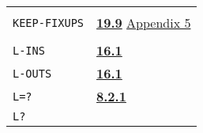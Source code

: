 \documentclass[a4paper]{scrbook}
\begin{document}
\begin{longtable}[]{@{}ll@{}}
\begin{minipage}[t]{0.24\columnwidth}\raggedright\strut
\strut
\end{minipage} & \begin{minipage}[t]{0.70\columnwidth}\raggedright\strut
\strut
\end{minipage}\tabularnewline
\begin{minipage}[t]{0.24\columnwidth}\raggedright\strut
\texttt{KEEP-FIXUPS}\strut
\end{minipage} & \begin{minipage}[t]{0.70\columnwidth}\raggedright\strut
\textbf{\href{19-compiled-programs.md\#199-fixups}{19.9}}
\href{appendix-5-initial-settings.md\#appendix-5-initial-settings}{Appendix 5}\strut
\end{minipage}\tabularnewline
\begin{minipage}[t]{0.24\columnwidth}\raggedright\strut
\strut
\end{minipage} & \begin{minipage}[t]{0.70\columnwidth}\raggedright\strut
\strut
\end{minipage}\tabularnewline
\begin{minipage}[t]{0.24\columnwidth}\raggedright\strut
\texttt{L-INS}\strut
\end{minipage} & \begin{minipage}[t]{0.70\columnwidth}\raggedright\strut
\textbf{\href{16-errors-frames-etc.md\#161-listen}{16.1}}\strut
\end{minipage}\tabularnewline
\begin{minipage}[t]{0.24\columnwidth}\raggedright\strut
\texttt{L-OUTS}\strut
\end{minipage} & \begin{minipage}[t]{0.70\columnwidth}\raggedright\strut
\textbf{\href{16-errors-frames-etc.md\#161-listen}{16.1}}\strut
\end{minipage}\tabularnewline
\begin{minipage}[t]{0.24\columnwidth}\raggedright\strut
\texttt{L=?}\strut
\end{minipage} & \begin{minipage}[t]{0.70\columnwidth}\raggedright\strut
\textbf{\href{08-truth.md\#821-arithmetic-1}{8.2.1}}\strut
\end{minipage}\tabularnewline
\begin{minipage}[t]{0.24\columnwidth}\raggedright\strut
\texttt{L?}\strut
\end{minipage} & \begin{minipage}[t]{0.70\columnwidth}\raggedright\strut

\end{minipage}
\end{longtable}
\end{document}
